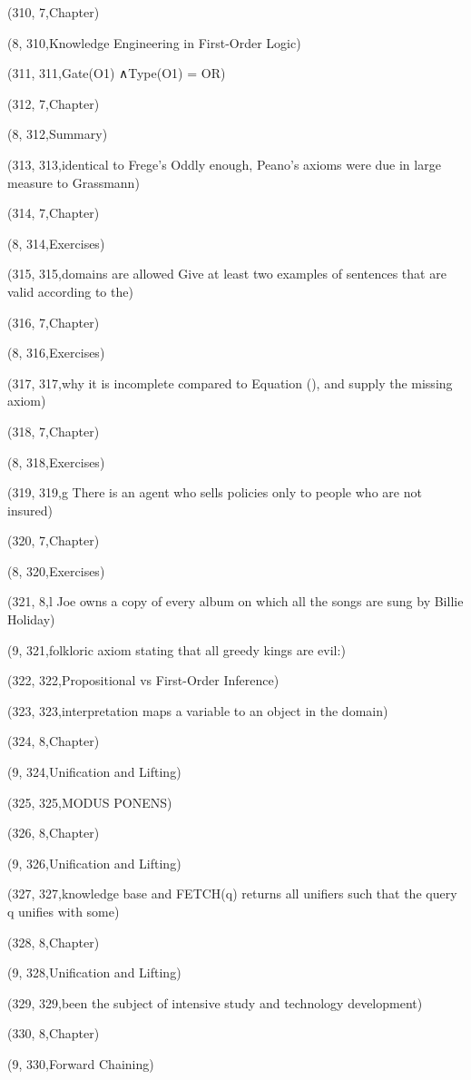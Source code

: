 (310, 7,Chapter)

(8, 310,Knowledge Engineering in First-Order Logic)

(311, 311,Gate(O1) ∧Type(O1) = OR)

(312, 7,Chapter)

(8, 312,Summary)

(313, 313,identical to Frege’s Oddly enough, Peano’s axioms were due in large measure to Grassmann)

(314, 7,Chapter)

(8, 314,Exercises)

(315, 315,domains are allowed Give at least two examples of sentences that are valid according to the)

(316, 7,Chapter)

(8, 316,Exercises)

(317, 317,why it is incomplete compared to Equation (), and supply the missing axiom)

(318, 7,Chapter)

(8, 318,Exercises)

(319, 319,g There is an agent who sells policies only to people who are not insured)

(320, 7,Chapter)

(8, 320,Exercises)

(321, 8,l Joe owns a copy of every album on which all the songs are sung by Billie Holiday)

(9, 321,folkloric axiom stating that all greedy kings are evil:)

(322, 322,Propositional vs First-Order Inference)

(323, 323,interpretation maps a variable to an object in the domain)

(324, 8,Chapter)

(9, 324,Uniﬁcation and Lifting)

(325, 325,MODUS PONENS)

(326, 8,Chapter)

(9, 326,Uniﬁcation and Lifting)

(327, 327,knowledge base and FETCH(q) returns all uniﬁers such that the query q uniﬁes with some)

(328, 8,Chapter)

(9, 328,Uniﬁcation and Lifting)

(329, 329,been the subject of intensive study and technology development)

(330, 8,Chapter)

(9, 330,Forward Chaining)


